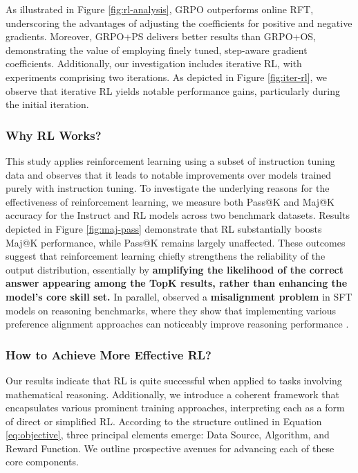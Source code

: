 As illustrated in Figure \ref{fig:rl-analysis}, GRPO outperforms online RFT, underscoring the advantages of adjusting the coefficients for positive and negative gradients. Moreover, GRPO+PS delivers better results than GRPO+OS, demonstrating the value of employing finely tuned, step-aware gradient coefficients. Additionally, our investigation includes iterative RL, with experiments comprising two iterations. As depicted in Figure \ref{fig:iter-rl}, we observe that iterative RL yields notable performance gains, particularly during the initial iteration.

\subsubsection{Why RL Works?} This study applies reinforcement learning using a subset of instruction tuning data and observes that it leads to notable improvements over models trained purely with instruction tuning. To investigate the underlying reasons for the effectiveness of reinforcement learning, we measure both Pass@K and Maj@K accuracy for the Instruct and RL models across two benchmark datasets. Results depicted in Figure \ref{fig:maj-pass} demonstrate that RL substantially boosts Maj@K performance, while Pass@K remains largely unaffected. These outcomes suggest that reinforcement learning chiefly strengthens the reliability of the output distribution, essentially by \textbf{amplifying the likelihood of the correct answer appearing among the TopK results, rather than enhancing the model's core skill set.} In parallel, \citep{wang2023making} observed a \textbf{misalignment problem} in SFT models on reasoning benchmarks, where they show that implementing various preference alignment approaches can noticeably improve reasoning performance \citep{yuan2023rrhf,song2023preference,wang2023making}.

\subsubsection{How to Achieve More Effective RL?}
\label{sec:effec_rl}
Our results indicate that RL is quite successful when applied to tasks involving mathematical reasoning. Additionally, we introduce a coherent framework that encapsulates various prominent training approaches, interpreting each as a form of direct or simplified RL. According to the structure outlined in Equation \ref{eq:objective}, three principal elements emerge: Data Source, Algorithm, and Reward Function. We outline prospective avenues for advancing each of these core components.

